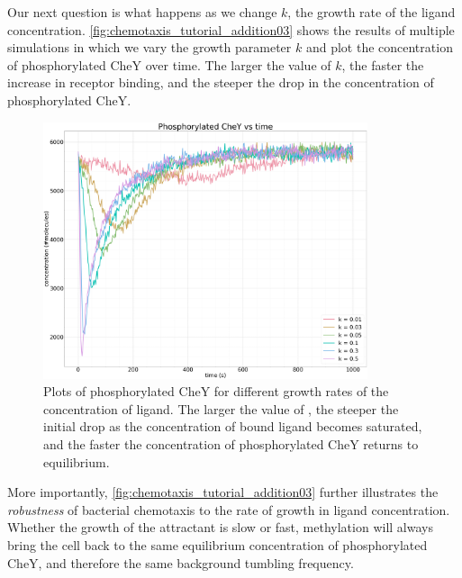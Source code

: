 Our next question is what happens as we change $k$, the growth rate of the ligand concentration. \autoref{fig:chemotaxis_tutorial_addition03} shows the results of multiple simulations in which we vary the growth parameter $k$ and plot the concentration of phosphorylated CheY over time. The larger the value of $k$, the faster the increase in receptor binding, and the steeper the drop in the concentration of phosphorylated CheY.\\

\begin{figure}[h]
\centering
\mySfFamily
\includegraphics[width = 0.85\textwidth]{../images/chemotaxis_tutorial_addition03.png}
\caption{Plots of phosphorylated CheY for different growth rates  of the concentration of ligand. The larger the value of , the steeper the initial drop as the concentration of bound ligand becomes saturated, and the faster the concentration of phosphorylated CheY returns to equilibrium.}
\label{fig:chemotaxis_tutorial_addition03}
\end{figure}

More importantly, \autoref{fig:chemotaxis_tutorial_addition03} further illustrates the \textit{robustness} of bacterial chemotaxis to the rate of growth in ligand concentration. Whether the growth of the attractant is slow or fast, methylation will always bring the cell back to the same equilibrium concentration of phosphorylated CheY, and therefore the same background tumbling frequency.

\begin{qbox}\end{qbox}

